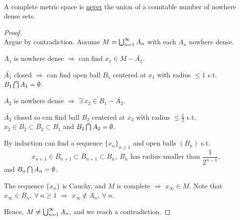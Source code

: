 \vspace{3pt}
\begin{proposition}\label{BCT}\ \\
A complete metric space is \underline{never} the union of a countable number of nowhere dense sets.
\end{proposition}
\begin{proof}\ \\
Argue by contradiction. Assume $M = \bigcup_{n=1}^{\infty} A_n$ with each $A_n$ nowhere dense.

\np $A_1$ is nowhere dense $\Rightarrow$ can find $x_1 \in M - \bar{A_1}$.

\np $\bar{A_1}$ closed $\Rightarrow$ can find open ball $B_1$ centered at $x_1$ with radius $\leq 1$ s.t. $B_1 \bigcap A_1 = \emptyset$.

\np $A_2$ is nowhere dense $\Rightarrow$ $\exists\ x_2 \in B_1 - \bar{A_2}$.

\np $\bar{A_2}$ closed so can find ball $B_2$ centered at $x_2$ with radius $\leq \frac{1}{2}$ s.t. $x_2 \in B_2 \subset \bar{B_2} \subset B_1$ and $B_2 \bigcap A_2 = \emptyset$.

\np By induction can find a sequence $\{x_n\}_{n \geq 1}$ and open balls $(B_n)$ s.t.
\begin{equation*}
    x_{n+1} \in B_{n+1} \subset \bar{B}_{n+1} \subset B_n,\ B_n \text{ has radius smaller than }\frac{1}{2^{n-1}},
\end{equation*}
and $B_n \bigcap A_n = \emptyset$.

\np The sequence $\{x_n\}$ is Cauchy, and $M$ is complete $\Rightarrow$ $x_\infty \in M$. Note that $x_\infty \in B_n,\ \forall\ n \geq 1$ $\Rightarrow$ $x_\infty \notin A_n,\ \forall\ n$.

\np Hence, $M \neq \bigcup_{n=1}^{\infty} A_n$, and we reach a contradiction.
\end{proof}


